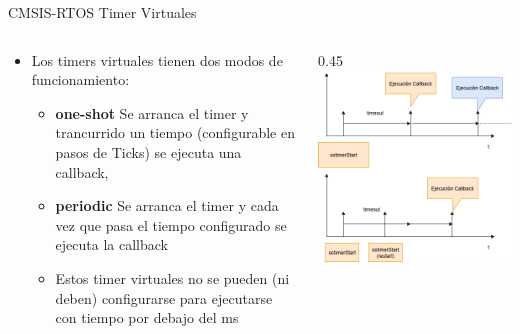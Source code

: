 \begin{frame}[fragile]{CMSIS-RTOS Timer Virtuales}
    \begin{columns}
        \begin{column}{0.55\textwidth}    
        \begin{itemize}
        \item Los timers virtuales tienen dos modos de funcionamiento:
        \begin{itemize}
            \item \textbf{one-shot} Se arranca el timer y trancurrido un tiempo (configurable en pasos de Ticks) se ejecuta una callback, 
            \item \textbf{periodic} Se arranca el timer y cada vez que pasa el tiempo configurado se ejecuta la callback
            \item Estos timer virtuales no se pueden (ni deben) configurarse para ejecutarse con tiempo por debajo del ms
        \end{itemize}
        \end{itemize}
        \end{column}
        \begin{column} {0.45\textwidth} 
        \includegraphics[scale=0.25]{presentation/softwaretimers.drawio.png}
     \end{column}
    \end{columns} 
\end{frame}

